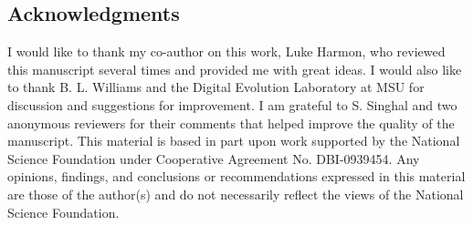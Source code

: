 \begin{doublespace}
\section*{Acknowledgments}

I would like to thank my co-author on this work, Luke Harmon,
who reviewed this manuscript several times and provided me with great ideas.
%
I would also like to thank B. L. Williams
and the Digital Evolution Laboratory at MSU
for discussion and suggestions for improvement.
%
I am grateful to S. Singhal and two anonymous reviewers for their comments
that helped improve the quality of the manuscript.
%
This material is based in part upon work supported by
the National Science Foundation under Cooperative Agreement No. DBI-0939454.
%
Any opinions, findings, and conclusions or recommendations
expressed in this material are those of the author(s)
and do not necessarily reflect the views of the National Science Foundation.


\end{doublespace}

\begin{lit_cited}
\end{lit_cited}



